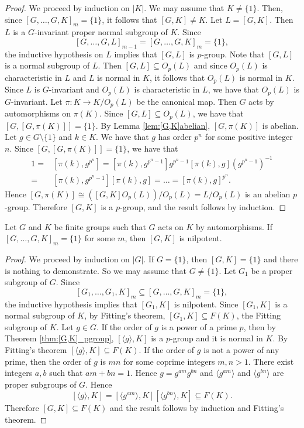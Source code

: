\begin{proof}
	We proceed by induction on $|K|$. We may assume that $K\ne\{1\}$. Then, since $[G,\dots,G,K]_m=\{1\}$, 
	it follows that $[G,K]\ne K$. Let $L=[G,K]$. Then $L$ is a $G$-invariant proper 
	normal subgroup of $K$. Since 
	\[
	[G,\dots,G,L]_{m-1}= [G,\dots,G,K]_m=\{1\},
	\]
	the inductive hypothesis on $L$ implies that $[G,L]$ is $p$-group. 
	Note that $[G,L]$ is a normal subgroup of $L$. Then $[G,L]\subseteq O_p(L)$ and since $O_p(L)$ is characteristic in $L$
	and $L$ is normal in $K$, it follows
	that $O_p(L)$ is normal in $K$. Since $L$ is $G$-invariant and $O_p(L)$ is characteristic in $L$, we have that $O_p(L)$ is $G$-invariant. Let $\pi\colon K\to K/O_p(L)$ be the canonical map. Then $G$ acts by automorphisms on $\pi(K)$.  Since $[G,L]\subseteq O_p(L)$, we have that $[G,[G,\pi(K)]]=\{ 1\}$. By Lemma \ref{lem:[G,K]abelian}, $[G,\pi(K)]$ is abelian. Let $g\in G\setminus \{ 1\}$ and $k\in K$. We have that $g$ has order $p^n$ for some positive integer $n$. Since $[G,[G,\pi(K)]]=\{ 1\}$, we have that
	\begin{align*} 1=&[\pi(k),g^{p^n}]=[\pi(k),g^{p^n-1}]g^{p^n-1}[\pi(k),g](g^{p^n-1})^{-1}\\
	=&[\pi(k),g^{p^n-1}][\pi(k),g]=\dots =[\pi(k),g]^{p^n}.
	\end{align*}
	Hence $[G,\pi(K)]\cong ([G,K]O_p(L))/O_p(L)=L/O_p(L)$ is an abelian $p$-group. Therefore $[G,K]$ is a $p$-group, and the result follows by induction.
	\end{proof}

\begin{theorem}\label{thm:general[G,K]nilpotent}
	Let $G$ and $K$ be finite groups such that $G$ acts on $K$ by automorphisms. 
	If $[G,\dots,G,K]_m=\{1\}$ for some $m$, then
	$[G,K]$ is nilpotent. 
\end{theorem}

\begin{proof}
	We proceed by induction on $|G|$. If $G=\{1\}$, then $[G,K]=\{1\}$ and there is nothing to demonstrate. So we may assume 
	that $G\ne\{1\}$. Let $G_1$ be a proper subgroup of $G$. Since 
	\[
	[G_1,\dots,G_1,K]_m\subseteq [G,\dots,G,K]_m=\{1\},
	\]
	the inductive hypothesis implies that $[G_1,K]$ is nilpotent. Since $[G_1,K]$ is a normal subgroup of $K$, by Fitting's theorem,
	$[G_1,K]\subseteq F(K)$, the Fitting subgroup of $K$. Let $g\in G$. If the order of $g$ is a power of a prime $p$, then by Theorem \ref{thm:[G,K]_pgroup}, $[\langle g\rangle,K]$ is a $p$-group and it is normal in $K$. By Fitting's theorem $[\langle g\rangle, K]\subseteq F(K)$. If the order of $g$ is not a power of any prime, then the order of $g$ is $mn$ for some coprime integers $m,n>1$. There exist integers $a,b$ such that $am+bn=1$. Hence $g=g^{am}g^{bn}$ and  $\langle g^{am}\rangle$ and $\langle g^{bn}\rangle$ are proper subgroups of $G$. Hence 
	\[ [\langle g\rangle, K]=[\langle g^{am}\rangle, K][\langle g^{bn}\rangle ,K]\subseteq F(K).\]
	Therefore $[G,K]\subseteq F(K)$ and the result follows by induction and Fitting's theorem.
\end{proof}

